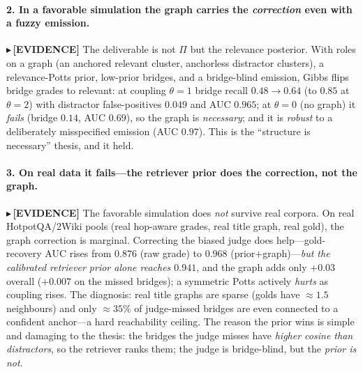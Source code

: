 \documentclass[11pt]{article}
\newcommand{\TESTED}[1]{{\color{teal}\small$\blacktriangleright$\,\textbf{[EVIDENCE]} #1}}
\begin{document}
\paragraph{2. In a favorable simulation the graph carries the \emph{correction} even with a fuzzy emission.}
\TESTED{The deliverable is not $\Pi$ but the relevance posterior. With roles on a graph (an anchored relevant
cluster, anchorless distractor clusters), a relevance-Potts prior, low-prior bridges, and a bridge-blind
emission, Gibbs flips bridge grades to relevant: at coupling $\theta{=}1$ bridge recall $0.48\to0.64$ (to $0.85$
at $\theta{=}2$) with distractor false-positives $0.049$ and AUC $0.965$; at $\theta{=}0$ (no graph) it
\emph{fails} (bridge $0.14$, AUC $0.69$), so the graph is \emph{necessary}; and it is \emph{robust} to a
deliberately misspecified emission (AUC $0.97$). This is the ``structure is necessary'' thesis, and it held.}

\paragraph{3. On real data it fails---the retriever prior does the correction, not the graph.}
\TESTED{The favorable simulation does \emph{not} survive real corpora. On real HotpotQA/2Wiki pools (real
hop-aware grades, real title graph, real gold), the graph correction is marginal. Correcting the biased judge
does help---gold-recovery AUC rises from $0.876$ (raw grade) to $0.968$ (prior$+$graph)---\emph{but the calibrated
retriever prior alone reaches $0.941$}, and the graph adds only $+0.03$ overall ($+0.007$ on the missed bridges);
a symmetric Potts actively \emph{hurts} as coupling rises. The diagnosis: real title graphs are sparse (golds
have $\approx1.5$ neighbours) and only $\approx35\%$ of judge-missed bridges are even connected to a confident
anchor---a hard reachability ceiling. The reason the prior wins is simple and damaging to the thesis: the
bridges the judge misses have \emph{higher cosine than distractors}, so the retriever ranks them; the judge is
bridge-blind, but the \emph{prior is not}.}
\end{document}
